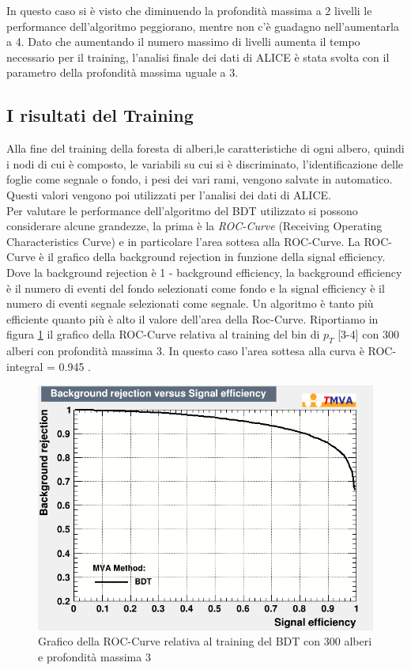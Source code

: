 In questo caso si è visto che diminuendo la profondità massima a 2 livelli le performance dell'algoritmo peggiorano, mentre non c'è guadagno nell'aumentarla a 4. Dato che aumentando il numero massimo di livelli aumenta il tempo necessario per il training, l'analisi finale dei dati di ALICE è stata svolta con il parametro della profondità massima uguale a 3.

\subsection{I risultati del Training}

Alla fine del training della foresta di alberi,le caratteristiche di ogni albero, quindi i nodi di cui è composto, le variabili su cui si è discriminato, l'identificazione delle foglie come segnale o fondo, i pesi dei vari rami, vengono salvate in automatico. Questi valori vengono poi utilizzati per l'analisi dei dati di ALICE. 
\\Per valutare le performance dell'algoritmo del BDT utilizzato si possono considerare alcune grandezze, la prima è la \textit{ROC-Curve} (Receiving Operating Characteristics Curve) e in particolare l'area sottesa alla ROC-Curve. La ROC-Curve è il grafico della background rejection in funzione della signal efficiency. Dove la background rejection è 1 - background efficiency, la background efficiency è il numero di eventi del fondo selezionati come fondo e la signal efficiency è il numero di eventi segnale selezionati come segnale.
Un algoritmo è tanto più efficiente quanto più è alto il valore dell'area della Roc-Curve. %
Riportiamo in figura \ref{fig:RocCurve} il grafico della ROC-Curve relativa al training del bin di $p_T$ [3-4] con 300 alberi con profondità massima 3. In questo caso l'area sottesa alla curva è ROC-integral = 0.945 . 
    \begin{figure}[htbp] 
        \centering
        \includegraphics[width=0.7\linewidth]{training&testing/RocCurve.png}
        \caption{Grafico della ROC-Curve relativa al training del BDT con 300 alberi e profondità massima 3}
        \label{fig:RocCurve}
    \end{figure}
    
